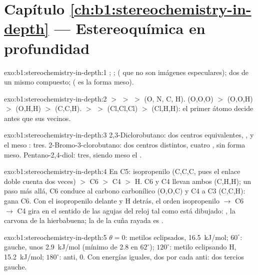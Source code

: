 \section*{Capítulo \ref{ch:b1:stereochemistry-in-depth} --- Estereoquímica en profundidad}

\begin{solution}{exo:b1:stereochemistry-in-depth:1}
; ; 
( que no son imágenes especulares); dos  de
un mismo compuesto;  ( es la forma meso).
\end{solution}

\begin{solution}{exo:b1:stereochemistry-in-depth:2}
 $>$  $>$  $>$  (O, N, C, H).
 (O,O,O) $>$  (O,O,H) $>$  (O,H,H) $>$
 (C,C,H).  $>$  $>$  (Cl,Cl,Cl)
$>$  (Cl,H,H): el primer átomo decide antes que sus vecinos.
\end{solution}

\begin{solution}{exo:b1:stereochemistry-in-depth:3}
2,3-Diclorobutano: dos centros equivalentes, ,  y el
meso : tres. 2-Bromo-3-clorobutano: dos centros distintos, cuatro
, sin forma meso. Pentano-2,4-diol: tres, siendo meso el
.
\end{solution}

\begin{solution}{exo:b1:stereochemistry-in-depth:4}
En C5: isopropenilo (C,C,C, pues el enlace doble cuenta dos veces) $>$ C6
$>$ C4 $>$ H. C6 y C4 llevan ambos (C,H,H); un paso más allá, C6 conduce
al carbono carbonílico (O,O,C) y C4 a C3 (C,C,H): gana C6. Con el
isopropenilo delante y H detrás, el orden isopropenilo $\to$ C6 $\to$ C4
gira en el sentido de las agujas del reloj tal como está dibujado:
, la carvona de la hierbabuena; la de la cuña rayada es .
\end{solution}

\begin{solution}{exo:b1:stereochemistry-in-depth:5}
$\theta = 0$: metilos eclipsados, \qty{16.5}{kJ/mol}; $60^\circ$: gauche,
unos \qty{2.9}{kJ/mol} (mínimo de 2.8 en $62^\circ$); $120^\circ$: metilo
eclipsando H, \qty{15.2}{kJ/mol}; $180^\circ$: anti, 0. Con energías
iguales, dos  por cada anti: dos tercios gauche.
\end{solution}

